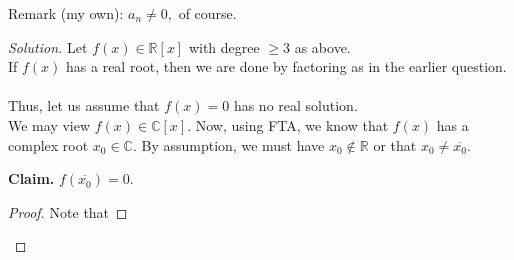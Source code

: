 \documentclass[12pt]{article}
\theoremstyle{definition}
\newenvironment{blockquote}
{\begin{mdframed}[skipabove=0pt, skipbelow=0pt, innertopmargin=4pt, innerbottommargin=4pt, bottomline=false,topline=false,rightline=false, linewidth=2pt]}
{\end{mdframed}}
\newenvironment{soln}{\begin{proof}[Solution]}{\end{proof}}
\begin{document}
\begin{enumerate}[leftmargin=*]
	Remark (my own): $a_n \neq 0,$ of course.
	\begin{soln}
		Let $f(x) \in \mathbb{R}[x]$ with degree $\ge 3$ as above.\\
		If $f(x)$ has a real root, then we are done by factoring as in the earlier question.\\~\\
		Thus, let us assume that $f(x) = 0$ has no real solution.\\
		We may view $f(x) \in \mathbb{C}[x].$ Now, using FTA, we know that $f(x)$ has a complex root $x_0 \in \mathbb{C}.$ By assumption, we must have $x_0 \notin \mathbb{R}$ or that $x_0 \neq \overline{x_0}.$ \\
		\begin{blockquote}
			\textbf{Claim.} $f(\overline{x_0}) = 0.$
			\begin{proof} 
				Note that


\end{proof}
\end{blockquote}
\end{soln}
\end{enumerate}
\end{document}
